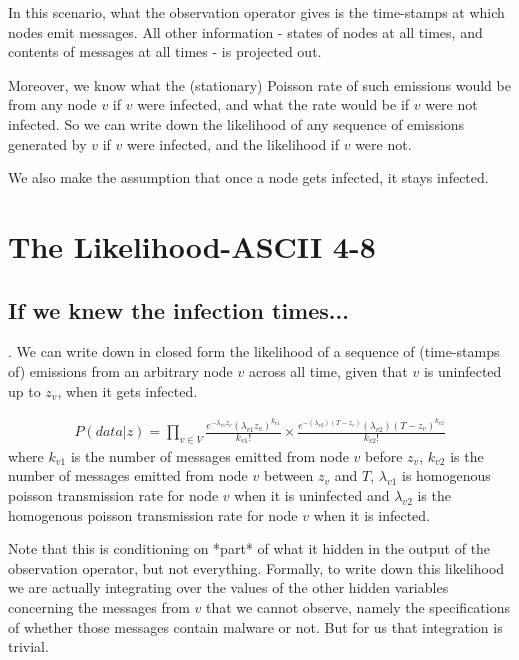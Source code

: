 \documentclass{article}
\begin{document}
	In this scenario, what the observation operator gives is the
	time-stamps at which nodes emit messages. All other information -
	states of nodes at all times, and contents of messages at all times -
	is projected out.

	Moreover, we know what the (stationary) Poisson rate of such emissions
	would be from any node $v$ if $v$ were infected, and what the rate would
	be if $v$ were not infected. So we can write down the likelihood of any
	sequence of emissions generated by $v$ if $v$ were infected, and the
	likelihood if $v$ were not.

	We also make the assumption that once a node gets infected, it
	stays infected.

\section{The Likelihood-ASCII 4-8}
\subsection{If we knew the infection times...}	
    .
	We can write down in closed form the likelihood
        of a sequence of (time-stamps of) emissions from an arbitrary node $v$ 
        across all time, given that  $v$ is uninfected up to $z_{v}$, when it 
        gets infected. 
        
        \begin{align}
        P(data | z) = \prod_{v\in V}\frac{e^{-\lambda_{v1}z_v}(\lambda_{v1}z_v)^{k_{v1}}}{k_{v1}!}\times 
        \frac{e^{-(\lambda_{v2})(T-z_v)}(\lambda_{v2})(T-z_v)^{k_{v2}}}{k_{v2}!}
        \label{nothidden}
        \end{align}
        where $k_{v1}$ is the number of messages emitted from node $v$ before 
        $z_v$, $k_{v2}$ is the number of messages emitted from node $v$ between 
        $z_v$ and $T$, $\lambda_{v1}$ is  homogenous poisson transmission rate for
        node $v$ when it is uninfected and $\lambda_{v2}$ is the  homogenous 
        poisson transmission rate for node $v$ when it is infected.  
 
	Note that this is conditioning on *part* of what it hidden in the
	output of the observation operator, but not everything.  Formally, to
	write down this likelihood we are actually integrating over the values
	of the other hidden variables concerning the messages from $v$ that we
	cannot observe, namely the specifications of whether those messages
	contain malware or not. But for us that integration is trivial. 
\end{document}
